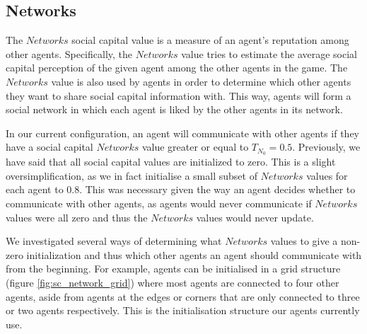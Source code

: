 \subsection{Networks}
The $Networks$ social capital value is a measure of an agent's reputation among other agents. Specifically, the $Networks$ value tries to estimate the average social capital perception of the given agent among the other agents in the game. The $Networks$ value is also used by agents in order to determine which other agents they want to share social capital information with. This way, agents will form a social network in which each agent is liked by the other agents in its network.

In our current configuration, an agent will communicate with other agents if they have a social capital $Networks$ value greater or equal to $T_{N_0} = 0.5$. Previously, we have said that all social capital values are initialized to zero. This is a slight oversimplification, as we in fact initialise a small subset of $Networks$ values for each agent to 0.8. This was necessary given the way an agent decides whether to communicate with other agents, as agents would never communicate if $Networks$ values were all zero and thus the $Networks$ values would never update. 

We investigated several ways of determining what $Networks$ values to give a non-zero initialization and thus which other agents an agent should communicate with from the beginning. For example, agents can be initialised in a grid structure (figure \ref{fig:sc_network_grid}) where most agents are connected to four other agents, aside from agents at the edges or corners that are only connected to three or two agents respectively. This is the initialisation structure our agents currently use.




